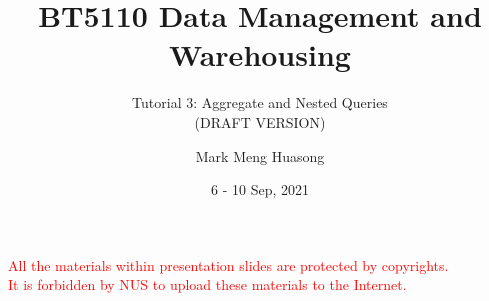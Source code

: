 \title{BT5110 Data Management and Warehousing}

\subtitle{Tutorial 3: Aggregate and Nested Queries\\(DRAFT VERSION)}

\author{Mark Meng Huasong}



\date{6 - 10 Sep, 2021}

\begin{frame}
	\titlepage
	\begin{tcolorbox}
		\begin{center}
			{\scriptsize \textcolor{red}{All the materials within presentation slides are protected by copyrights.\\
					It is forbidden by NUS to upload these materials to the Internet.}}
		\end{center}
	\end{tcolorbox}
\end{frame}

